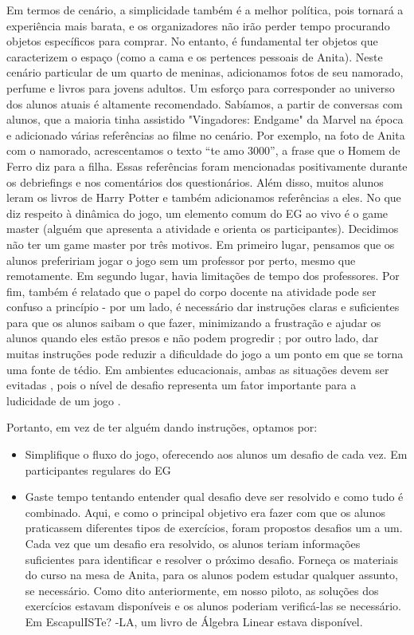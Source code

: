 Em termos de cenário, a simplicidade também é a melhor política, pois tornará a experiência mais barata, e os organizadores não irão perder tempo procurando objetos específicos para comprar. No entanto, é fundamental ter objetos que caracterizem o espaço (como a cama e os pertences pessoais de Anita). Neste cenário particular de um quarto de meninas, adicionamos fotos de seu namorado, perfume e livros para jovens adultos. Um esforço para corresponder ao universo dos alunos atuais é altamente recomendado. Sabíamos, a partir de conversas com alunos, que a maioria tinha assistido "Vingadores: Endgame" da Marvel na época e adicionado várias referências ao filme no cenário. Por exemplo, na foto de Anita com o namorado, acrescentamos o texto “te amo 3000”, a frase que o Homem de Ferro diz para a filha. Essas referências foram mencionadas positivamente durante os debriefings e nos comentários dos questionários. Além disso, muitos alunos leram os livros de Harry Potter e também adicionamos referências a eles. No que diz respeito à dinâmica do jogo, um elemento comum do EG ao vivo é o game master (alguém que apresenta a atividade e orienta os participantes). Decidimos não ter um game master por três motivos. Em primeiro lugar, pensamos que os alunos prefeririam jogar o jogo sem um professor por perto, mesmo que remotamente. Em segundo lugar, havia limitações de tempo dos professores. Por fim, também é relatado que o papel do corpo docente na atividade pode ser confuso a princípio - por um lado, é necessário dar instruções claras e suficientes para que os alunos saibam o que fazer, minimizando a frustração \citep{hermanns_using_2017} e ajudar os alunos quando eles estão presos e não podem progredir \citep{borrego_room_2017}; por outro lado, dar muitas instruções pode reduzir a dificuldade do jogo a um ponto em que se torna uma fonte de tédio. Em ambientes educacionais, ambas as situações devem ser evitadas \citep{vahldick_dynamic_2017}, pois o nível de desafio representa um fator importante para a ludicidade de um jogo \citep{hong_playfulness-based_2009}.

Portanto, em vez de ter alguém dando instruções, optamos por:

\begin{itemize}
    \item Simplifique o fluxo do jogo, oferecendo aos alunos um desafio de cada vez. Em participantes regulares do EG
    \item Gaste tempo tentando entender qual desafio deve ser resolvido e como tudo é combinado. Aqui, e como o principal objetivo era fazer com que os alunos praticassem diferentes tipos de exercícios, foram propostos desafios um a um. Cada vez que um desafio era resolvido, os alunos teriam informações suficientes para identificar e resolver o próximo desafio. Forneça os materiais do curso na mesa de Anita, para os alunos podem estudar qualquer assunto, se necessário. Como dito anteriormente, em nosso piloto, as soluções dos exercícios estavam disponíveis e os alunos poderiam verificá-las se necessário. Em EscapulISTe? -LA, um livro de Álgebra Linear estava disponível.
\end{itemize}

